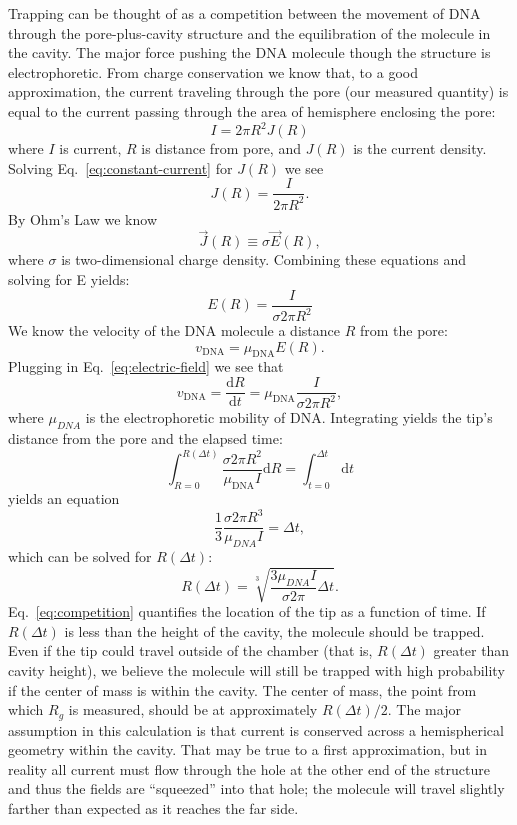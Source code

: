 \documentclass[aps,prl,preprint,groupedaddress]{revtex4}
\begin{document}
Trapping can be thought of as a competition between the movement of DNA through the pore-plus-cavity structure and the equilibration of the molecule in the cavity.
The major force pushing the DNA molecule though the structure is electrophoretic.
From charge conservation we know that, to a good approximation, the current traveling through the pore (our measured quantity) is equal to the current passing through the area of hemisphere enclosing the pore: 
\begin{equation} I = 2 \pi R^2 J(R) \label{eq:constant-current}\end{equation} 
where \(I\) is current, \(R\) is distance from pore, and \(J(R)\) is the current density.
Solving Eq.~\ref{eq:constant-current} for \(J(R)\) we see 
\[J(R) = \frac{I}{2 \pi R^2}.\] 
By Ohm's Law we know 
\[\overrightarrow{J}(R) \equiv \sigma \overrightarrow{E}(R),\]
where \(\sigma\) is two-dimensional charge density.
Combining these equations and solving for E yields:
\begin{equation} E(R) = \frac{I}{\sigma 2 \pi R^2} \label{eq:electric-field} \end{equation} 
We know the velocity of the DNA molecule a distance \(R\) from the pore: 
\begin{equation} v_{\mathrm{DNA}} = \mu_{\mathrm{DNA}} E(R) \label{eq:velocity} .\end{equation} 
Plugging in Eq.~\ref{eq:electric-field} we see that
\[v_{\mathrm{DNA}} = \frac{\mathrm{d}R}{\mathrm{d}t} = \mu_{\mathrm{DNA}} \frac{I}{\sigma 2 \pi R^2},\]
where \(\mu_{DNA}\) is the electrophoretic mobility of DNA.
Integrating yields the tip's distance from the pore and the elapsed time:
\[\int_{R=0}^{R(\Delta t)} \frac{\sigma 2 \pi R^2}{\mu_{\mathrm{DNA}} I} \mathrm{d}R = \int_{t=0}^{\Delta t} \mathrm{d}t \]
yields an equation
\[\frac{1}{3} \frac{\sigma 2 \pi R^3}{\mu_{DNA} I} = \Delta t,\]
which can be solved for \(R(\Delta t)\):
\begin{equation} R(\Delta t) = \sqrt[3]{\frac{3 \mu_{DNA} I}{\sigma 2 \pi}\Delta t} .\label{eq:competition}\end{equation}
Eq.~\ref{eq:competition} quantifies the location of the tip as a function of time.
If \(R(\Delta t)\) is less than the height of the cavity, the molecule should be trapped.
Even if the tip could travel outside of the chamber (that is, \(R(\Delta t)\) greater than cavity height), we believe the molecule will still be trapped with high probability if the center of mass is within the cavity.
The center of mass, the point from which \(R_g\) is measured, should be at approximately \(R(\Delta t)/2\).
The major assumption in this calculation is that current is conserved across a hemispherical geometry within the cavity.
That may be true to a first approximation, but in reality all current must flow through the hole at the other end of the structure and thus the fields are ``squeezed'' into that hole; the molecule will travel slightly farther than expected as it reaches the far side.
\end{document}
